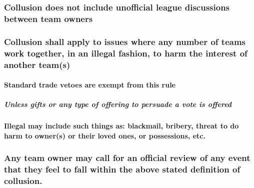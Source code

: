 \documentclass[
]{book}
\begin{document}
\hypertarget{collusion-does-not-include-unofficial-league-discussions-between-team-owners}{%
\subsubsection{Collusion does not include unofficial league discussions between team owners}\label{collusion-does-not-include-unofficial-league-discussions-between-team-owners}}

\hypertarget{collusion-shall-apply-to-issues-where-any-number-of-teams-work-together-in-an-illegal-fashion-to-harm-the-interest-of-another-teams}{%
\subsubsection{Collusion shall apply to issues where any number of teams work together, in an illegal fashion, to harm the interest of another team(s)}\label{collusion-shall-apply-to-issues-where-any-number-of-teams-work-together-in-an-illegal-fashion-to-harm-the-interest-of-another-teams}}

\hypertarget{standard-trade-vetoes-are-exempt-from-this-rule}{%
\paragraph{Standard trade vetoes are exempt from this rule}\label{standard-trade-vetoes-are-exempt-from-this-rule}}

\hypertarget{unless-gifts-or-any-type-of-offering-to-persuade-a-vote-is-offered}{%
\subparagraph{Unless gifts or any type of offering to persuade a vote is offered}\label{unless-gifts-or-any-type-of-offering-to-persuade-a-vote-is-offered}}

\hypertarget{illegal-may-include-such-things-as-blackmail-bribery-threat-to-do-harm-to-owners-or-their-loved-ones-or-possessions-etc.}{%
\paragraph{Illegal may include such things as: blackmail, bribery, threat to do harm to owner(s) or their loved ones, or possessions, etc.}\label{illegal-may-include-such-things-as-blackmail-bribery-threat-to-do-harm-to-owners-or-their-loved-ones-or-possessions-etc.}}

\hypertarget{any-team-owner-may-call-for-an-official-review-of-any-event-that-they-feel-to-fall-within-the-above-stated-definition-of-collusion.}{%
\subsubsection{Any team owner may call for an official review of any event that they feel to fall within the above stated definition of collusion.}\label{any-team-owner-may-call-for-an-official-review-of-any-event-that-they-feel-to-fall-within-the-above-stated-definition-of-collusion.}}
\end{document}
